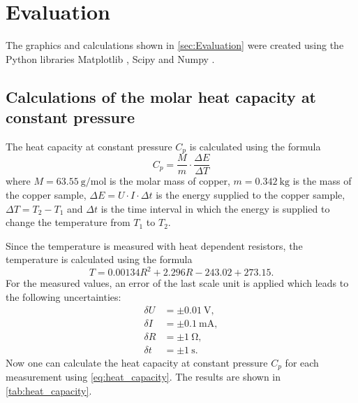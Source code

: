 \section{Evaluation}
\label{sec:Evaluation}
The graphics and calculations shown in \autoref{sec:Evaluation} were created using the Python libraries Matplotlib \cite{matplotlib}, Scipy \cite{scipy} and Numpy \cite{numpy}.

\subsection{Calculations of the molar heat capacity at constant pressure}
\label{sec:heat_capacity}

The heat capacity at constant pressure $C_p$ is calculated using the formula
\begin{equation}\label{eq:heat_capacity}
    C_p = \frac{M}{m} \cdot \frac{\Delta E}{\Delta T}
\end{equation}
where $M = \SI{63.55}{\g\per\mol}$ \cite{molar_mass_copper} is the molar mass of copper, $m = \SI{0.342}{\kg}$ \cite{V47} is the mass of the copper sample, $\Delta E = U \cdot I \cdot \Delta t$ is
the energy supplied to the copper sample, $\Delta T = T_2 - T_1$ and $\Delta t$ is the time interval in which the energy is supplied to change the temperature from $T_1$ to $T_2$.

Since the temperature is measured with heat dependent resistors, the temperature is calculated using the formula
\begin{equation*}
    T = 0.00134R^2 + 2.296R - 243.02 + 273.15.
\end{equation*}
For the measured values, an error of the last scale unit is applied which leads to the following uncertainties:
\begin{align*}
    \delta U &= \pm \SI{0.01}{\V}, \\
    \delta I &= \pm \SI{0.1}{\milli\A}, \\
    \delta R &= \pm \SI{1}{\ohm}, \\
    \delta t &= \pm \SI{1}{\s}.
\end{align*}
Now one can calculate the heat capacity at constant pressure $C_p$ for each measurement using \autoref{eq:heat_capacity}. The results are shown in \autoref{tab:heat_capacity}.

